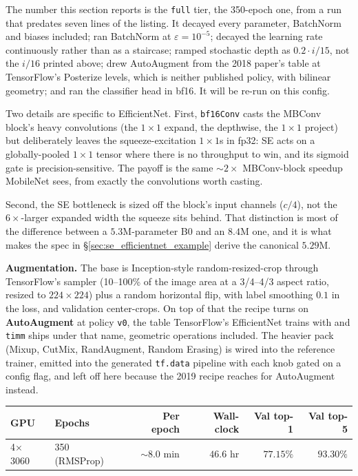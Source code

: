 \noindent The number this section reports is the \texttt{full} tier, the
350-epoch one, from a run that predates seven lines of the listing. It
decayed every parameter, BatchNorm and biases included; ran BatchNorm at
$\varepsilon = 10^{-5}$; decayed the learning rate continuously rather than
as a staircase; ramped stochastic depth as \(0.2 \cdot i/15\), not the
\(i/16\) printed above; drew AutoAugment from the 2018 paper's table at
TensorFlow's Posterize levels, which is neither published policy, with
bilinear geometry; and ran the classifier head in bf16. It will be
re-run on this config.

Two details are specific to EfficientNet. First, \texttt{bf16Conv}
casts the MBConv block's heavy convolutions (the $1\times1$
expand, the depthwise, the $1\times1$ project) but deliberately
leaves the squeeze-excitation $1\times1$s in fp32: SE acts on a
globally-pooled $1\times1$ tensor where there is no throughput to
win, and its sigmoid gate is precision-sensitive. The payoff is the
same $\sim2\times$ MBConv-block speedup MobileNet sees, from exactly
the convolutions worth casting.

Second, the SE bottleneck is sized off the block's input
channels ($c/4$), not the $6\times$-larger expanded width the squeeze
sits behind. That distinction is most of the difference between a
$5.3$M-parameter B0 and an $8.4$M one, and it is what makes the spec in
\S\ref{sec:se_efficientnet_example} derive the canonical
$\mathbf{5.29}$M.

\textbf{Augmentation.} The base is Inception-style random-resized-crop
through TensorFlow's sampler (10--100\% of the image area at a 3/4--4/3
aspect ratio, resized to $224\times224$) plus a random horizontal flip,
with label smoothing $0.1$ in the loss, and validation center-crops. On
top of that the recipe turns on \textbf{AutoAugment} at policy
\texttt{v0}, the table TensorFlow's EfficientNet trains with and
\texttt{timm} ships under that name, geometric operations included. The heavier pack (Mixup, CutMix, RandAugment, Random Erasing) is
wired into the reference trainer, emitted into the generated
\texttt{tf.data} pipeline with each knob gated on a config flag, and left
off here because the 2019 recipe reaches for AutoAugment instead.

\begin{center}
\begin{tabular}{l l r r r r}
\hline
GPU & Epochs & Per epoch & Wall-clock & Val top-1 & Val top-5 \\
\hline
4$\times$ 3060 & 350 (RMSProp) & $\sim$8.0 min & $46.6$ hr & $\mathbf{77.15\%}$ & $\mathbf{93.30\%}$ \\
\hline
\end{tabular}
\end{center}

